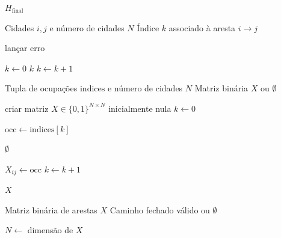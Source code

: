 \begin{apendicesenv}
\begin{algorithm}[htbp]
\begin{algorithmic}[1]
\State \Return $H_{\mathrm{final}}$
\end{algorithmic}
\end{algorithm}

\begin{algorithm}[htbp]
\caption{Mapeamento de uma aresta dirigida para o índice do qumode}
\label{alg:indice_aresta}
\begin{algorithmic}[1]
\Require Cidades $i,j$ e número de cidades $N$
\Ensure Índice $k$ associado à aresta $i \to j$

    \State lançar erro
\EndIf

\State $k \gets 0$
                \State \Return $k$
            \EndIf
            \State $k \gets k+1$
        \EndIf
    \EndFor
\EndFor
\end{algorithmic}
\end{algorithm}

\begin{algorithm}[htbp]
\caption{Conversão dos índices de ocupação em matriz binária de arestas}
\label{alg:indices_para_matriz}
\begin{algorithmic}[1]
\Require Tupla de ocupações $\mathrm{indices}$ e número de cidades $N$
\Ensure Matriz binária $X$ ou $\emptyset$

\State criar matriz $X \in \{0,1\}^{N \times N}$ inicialmente nula
\State $k \gets 0$

            \State $\mathrm{occ} \gets \mathrm{indices}[k]$

                \State \Return $\emptyset$
            \EndIf

            \State $X_{ij} \gets \mathrm{occ}$
            \State $k \gets k+1$
        \EndIf
    \EndFor
\EndFor

\State \Return $X$
\end{algorithmic}
\end{algorithm}

\begin{algorithm}[htbp]
\caption{Validação da matriz binária como ciclo Hamiltoniano}
\label{alg:matriz_para_caminho}
\begin{algorithmic}[1]
\Require Matriz binária de arestas $X$
\Ensure Caminho fechado válido ou $\emptyset$

\State $N \gets$ dimensão de $X$


\end{algorithmic}
\end{algorithm}
\end{apendicesenv}
